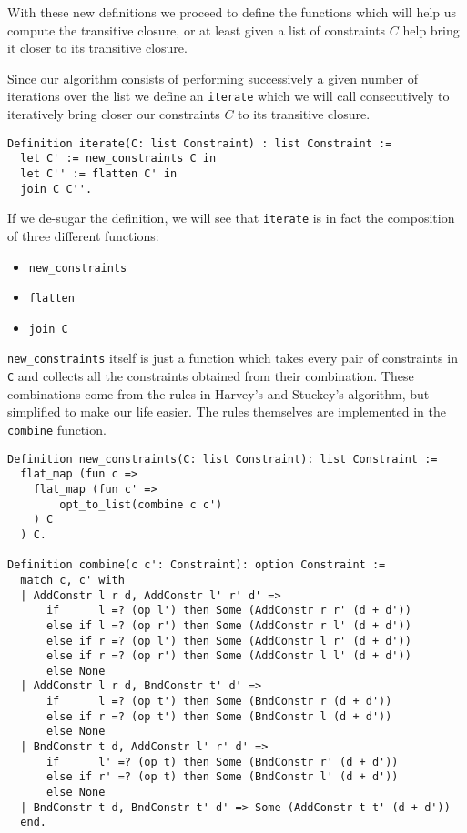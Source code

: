 With these new definitions we proceed to define the functions which will help us 
compute the transitive closure, or at least given a list of constraints $C$ help bring
it closer to its transitive closure.

Since our algorithm consists of performing successively a given number of iterations
over the list we define an \texttt{iterate} which we will call consecutively to
iteratively bring closer our constraints $C$ to its transitive closure.

\begin{verbatim}
Definition iterate(C: list Constraint) : list Constraint :=
  let C' := new_constraints C in
  let C'' := flatten C' in
  join C C''.
\end{verbatim}

If we de-sugar the definition, we will see that \texttt{iterate} is in fact the composition of
three different functions: 

\begin{itemize}
    \item \texttt{new_constraints}
    \item \texttt{flatten}
    \item \texttt{join C}
\end{itemize}

\texttt{new_constraints} itself is just a function which takes every pair of constraints in 
\texttt{C} and collects all the constraints obtained from their combination.
These combinations come from the rules in Harvey's and Stuckey's algorithm\cite{HarveyStuckey},
but simplified to make our life easier. The rules themselves are implemented in the 
\texttt{combine} function.

\begin{verbatim}
Definition new_constraints(C: list Constraint): list Constraint :=
  flat_map (fun c => 
    flat_map (fun c' => 
        opt_to_list(combine c c')
    ) C
  ) C.
  
Definition combine(c c': Constraint): option Constraint :=
  match c, c' with
  | AddConstr l r d, AddConstr l' r' d' =>
      if      l =? (op l') then Some (AddConstr r r' (d + d'))
      else if l =? (op r') then Some (AddConstr r l' (d + d'))
      else if r =? (op l') then Some (AddConstr l r' (d + d'))
      else if r =? (op r') then Some (AddConstr l l' (d + d'))
      else None
  | AddConstr l r d, BndConstr t' d' =>
      if      l =? (op t') then Some (BndConstr r (d + d'))
      else if r =? (op t') then Some (BndConstr l (d + d'))
      else None
  | BndConstr t d, AddConstr l' r' d' =>
      if      l' =? (op t) then Some (BndConstr r' (d + d'))
      else if r' =? (op t) then Some (BndConstr l' (d + d'))
      else None
  | BndConstr t d, BndConstr t' d' => Some (AddConstr t t' (d + d'))
  end.
\end{verbatim}

